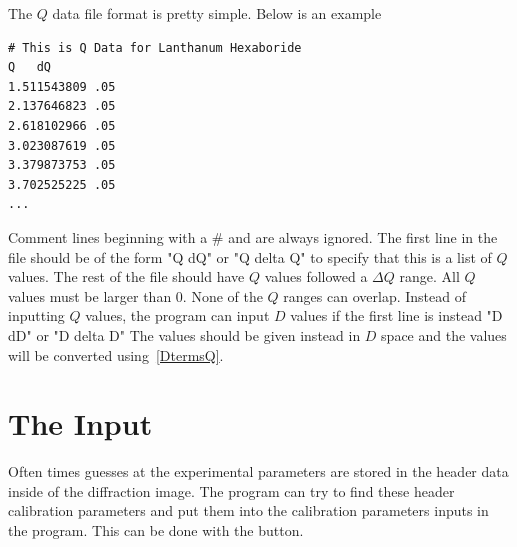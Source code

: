 The $Q$ data file format is pretty simple. Below is an example 
\begin{lstlisting}[caption={Lanthanum Hexaboride.dat},label=LaB6]
# This is Q Data for Lanthanum Hexaboride
Q   dQ
1.511543809 .05
2.137646823 .05
2.618102966 .05
3.023087619 .05
3.379873753 .05
3.702525225 .05
...
\end{lstlisting}
Comment lines beginning with a \# and are always ignored. The
first line in the file should be of the form "Q  dQ" or "Q  delta Q" 
to specify that this is a list of $Q$ values. The rest of the
file should have $Q$ values followed a $\Delta Q$ range.
All $Q$ values must be larger than 0. None of the $Q$ ranges can 
overlap. Instead of inputting $Q$ values, the program can input
$D$ values if the first line is instead "D dD" or "D delta D"
The values should be given instead in $D$ space and the values
will be converted using~\ref{DtermsQ}.

\section{\texorpdfstring{The  Input}
    {The ''Get From Header Input''}}

Often times guesses at the experimental parameters are 
stored in the header data inside of the diffraction image. 
The program can try to find these header calibration parameters
and put them into the calibration parameters inputs in the 
program. This can be done with the  
button.



